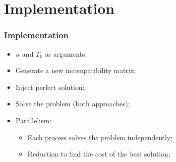 \section{Implementation}
\label{sec:implementation}

\begin{frame}
	\frametitle{Implementation}
	\begin{itemize}
		\item{$n$ and $T_{0}$ as arguments;}
		\vfill
		\item{Generate a new incompatibility matrix;}
		\vfill
		\item{Inject perfect solution;}
		\vfill
		\item{Solve the problem (both approaches);}
		\vfill
		\item{Parallelism:
		\begin{itemize}
			\item{Each process solves the problem independently;}
			\item{Reduction to find the cost of the best solution;}
		\end{itemize}
		}
	\end{itemize}
\end{frame}